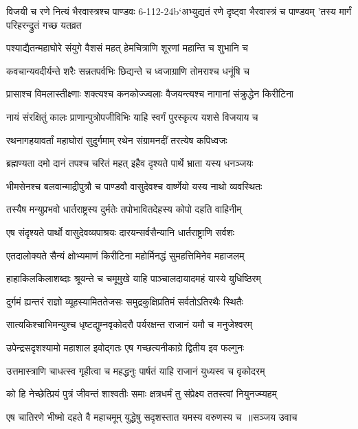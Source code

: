 \threelineshloka
{विजयी च रणे नित्यं भैरवास्त्रश्च पाण्डवः}
{6-112-24b`अभ्युद्यतं रणे दृष्ट्वा भैरवास्त्रं च पाण्डवम्}
{'तस्य मार्गं परिहरन्द्रुतं गच्छ यतव्रत}


\twolineshloka
{पश्याद्यैतन्महाघोरे संयुगे वैशसं महत्}
{हेमचित्राणि शूरणां महान्ति च शुभानि च}


\twolineshloka
{कवचान्यवदीर्यन्ते शरैः सन्नतपर्वभिः}
{छिद्यन्ते च ध्वजाग्राणि तोमराश्च धनूंषि च}


\twolineshloka
{प्रासाश्च विमलास्तीक्ष्णाः शक्त्यश्च कनकोज्ज्वलाः}
{वैजयन्त्यश्च नागानां संक्रुद्धेन किरीटिना}


\twolineshloka
{नायं संरक्षितुं कालः प्राणान्पुत्रोपजीविभिः}
{याहि स्वर्गं पुरस्कृत्य यशसे विजयाय च}


\twolineshloka
{रथनागहयावर्तां महाघोरां सुदुर्गमाम्}
{रथेन संग्रामनदीं तरत्येष कपिध्वजः}


\twolineshloka
{ब्रह्मण्यता दमो दानं तपश्च चरितं महत्}
{इहैव दृश्यते पार्थे भ्राता यस्य धनञ्जयः}


\twolineshloka
{भीमसेनश्च बलवान्माद्रीपुत्रौ च पाण्डवौ}
{वासुदेवश्च वार्ष्णेयो यस्य नाथो व्यवस्थितः}


\twolineshloka
{तस्यैष मन्युप्रभवो धार्तराष्ट्रस्य दुर्मतेः}
{तपोभावितदेहस्य कोपो दहति वाहिनीम्}


\twolineshloka
{एष संदृश्यते पार्थो वासुदेवव्यपाश्रयः}
{दारयन्सर्वसैन्यानि धार्तराष्ट्राणि सर्वशः}


\twolineshloka
{एतदालोक्यते सैन्यं क्षोभ्यमाणं किरीटिना}
{महोर्मिनद्धं सुमहत्तिमिनेव महाजलम्}


\twolineshloka
{हाहाकिलकिलाशब्दाः श्रूयन्ते च चमूमुखे}
{याहि पाञ्चालदायादमहं यास्ये युधिष्ठिरम्}


\twolineshloka
{दुर्गमं ह्यन्तरं राज्ञो व्यूहस्यामिततेजसः}
{समुद्रकुक्षिप्रतिमं सर्वतोऽतिरथैः स्थितैः}


\twolineshloka
{सात्यकिश्चाभिमन्युश्च धृष्टद्युम्नवृकोदरौ}
{पर्यरक्षन्त राजानं यमौ च मनुजेश्वरम्}


\twolineshloka
{उपेन्द्रसदृशश्यामो महाशाल इवोद्गतः}
{एष गच्छत्यनीकाग्रे द्वितीय इव फल्गुनः}


\twolineshloka
{उत्तमास्त्राणि चाधत्स्व गृहीत्वा च महद्धनुः}
{पार्षतं याहि राजानं युध्यस्व च वृकोदरम्}


\twolineshloka
{को हि नेच्छेत्प्रियं पुत्रं जीवन्तं शाश्वतीः समाः}
{क्षत्रधर्मं तु संप्रेक्ष्य ततस्त्वां नियुनज्म्यहम्}


\threelineshloka
{एष चातिरणे भीष्मो दहते वै महाचमूम्}
{युद्धेषु सदृशस्तात यमस्य वरुणस्य च ॥सञ्जय उवाच}
{}


